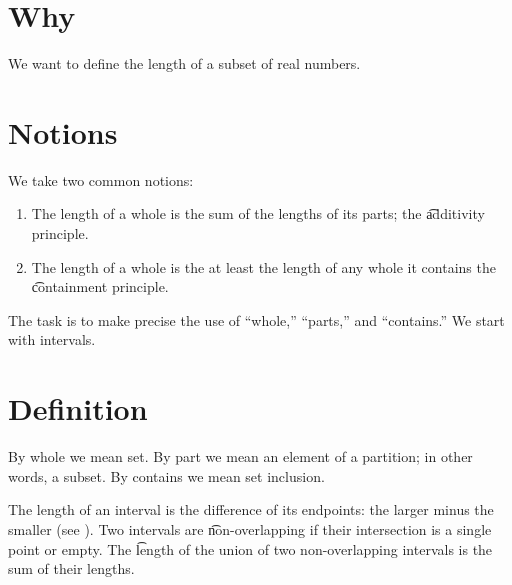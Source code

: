 

\section*{Why}

We want to define the length of a subset of real numbers.

\section*{Notions}

We take two common notions:

\begin{enumerate}
  \item The length of a whole is the sum of the lengths of its parts; the \t{additivity principle}.
  \item The length of a whole is the at least the length of any whole it contains the \t{containment principle}.
\end{enumerate}
The task is to make precise the use of ``whole,'' ``parts,'' and ``contains.''
We start with intervals.

\section*{Definition}

By whole we mean set.
By part we mean an element of a partition; in other words, a subset.
By contains we mean set inclusion.

The length of an interval is the difference of its endpoints: the larger minus the smaller (see ).
Two intervals are \t{non-overlapping} if their intersection is a single point or empty.
The \t{length} of the union of two non-overlapping intervals is the sum of their lengths.

